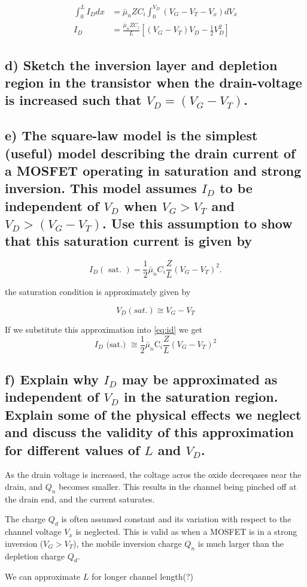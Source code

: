 $$
\begin{aligned}
\int_0^L I_D d x & =\bar{\mu}_n Z C_i \int_0^{V_D}\left(V_G-V_T-V_x\right) d V_x \\
I_D & =\frac{\bar{\mu}_n Z C_i}{L}\left[\left(V_G-V_T\right) V_D-\frac{1}{2} V_D^2\right]
\label{eq:id}
\end{aligned}
$$


\subsection*{d) Sketch the inversion layer and depletion region in the transistor when the drain-voltage is increased such that $V_D=\left(V_G-V_T\right)$.}


\subsection*{e) The square-law model is the simplest (useful) model describing the drain current of a MOSFET operating in saturation and strong inversion. This model assumes $I_D$ to be independent of $V_D$ when $V_G>V_T$ and $V_D>\left(V_G-V_T\right)$. Use this assumption to show that this saturation current is given by}

$$
I_D(\text { sat. })=\frac{1}{2} \bar{\mu}_n C_i \frac{Z}{L}\left(V_G-V_T\right)^2 .
$$

the saturation condition is approximately given by 

$$V_D(sat.)\cong V_G-V_T$$

If we substitute this approximation into \ref*{eq:id} we get
$$
I_D \text { (sat.) } \cong \frac{1}{2} \bar{\mu}_n \mathrm{C}_i \frac{Z}{L}\left(V_G-V_T\right)^2
$$


\subsection*{f) Explain why $I_D$ may be approximated as independent of $V_D$ in the saturation region. Explain some of the physical effects we neglect and discuss the validity of this approximation for different values of $L$ and $V_D$.}

As the drain voltage is increased, the coltage acros the oxide decreqases near the drain, and $Q_n$ becomes smaller. This results in the channel being pinched off at the drain end, and the current saturates.

The charge $Q_d$ is often assumed constant and its variation with respect to the channel voltage $V_x$ is neglected. This is valid as when a MOSFET is in a strong inversion ($V_G>V_T$), the mobile inversion charge $Q_n$ is much larger than the depletion charge $Q_d$.

We can approximate $L$ for longer channel length(?)

